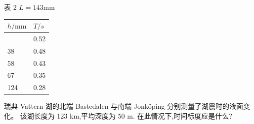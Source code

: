 \documentclass[UTF8,fontset=fandol,a4paper,11pt]{ctexart}
\begin{document}
表 2 \(L=143 \mathrm{mm}\)

{\def\LTcaptype{none} %
\begin{longtable}[]{@{}ll@{}}
\toprule\noalign{}
$h/\mathrm{mm}$ & \(T/s\) \\
\midrule\noalign{}
\endhead
\bottomrule\noalign{}
\endlastfoot
31 & 0.52 \\
38 & 0.48 \\
58 & 0.43 \\
67 & 0.35 \\
124 & 0.28 \\
\end{longtable}
}

瑞典 Vattern 湖的北端 Bastedalen 与南端 Jonköping
分别测量了湖震时的液面变化。 该湖长度为 123 km,平均深度为 50 m.
在此情况下,时间标度应是什么?
\end{document}

